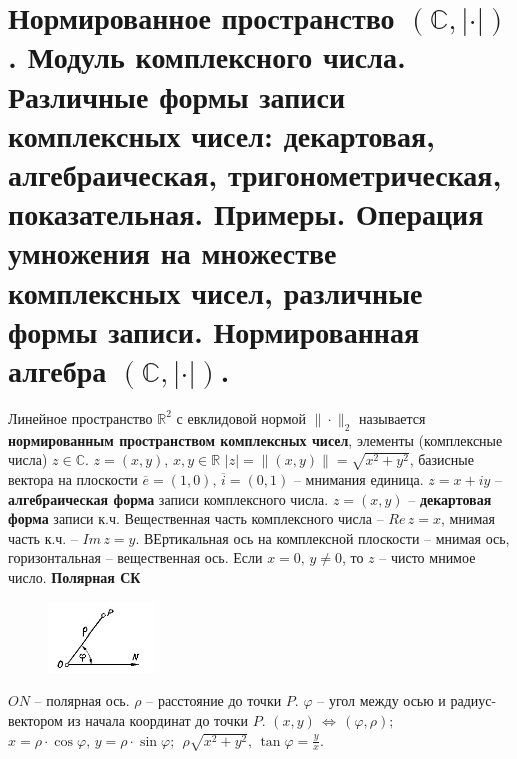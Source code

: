 \documentclass{article}
\newcommand{\R}{\mathbb R}
\newcommand{\n}{\bigbreak}
\begin{document}
\newpage
\section{Нормированное пространство $(\mathbb{C},|\cdot|)$ . Модуль комплексного числа. Различные формы записи комплексных чисел: декартовая, алгебраическая, тригонометрическая, показательная. Примеры. Операция умножения на множестве комплексных чисел, различные формы записи. Нормированная алгебра $(\mathbb{C},|\cdot|)$.}
Линейное пространство $\R^2$ с евклидовой нормой $\|\cdot\|_2$ называется \textbf{нормированным пространством комплексных чисел}, элементы (комплексные числа) $z\in\mathbb{C}$.
\newline
\newline
$z=(x,y),\,x,y\in\R$
\newline
$|z|=\|(x,y)\|=\sqrt{x^2+y^2}$, базисные вектора на плоскости $\overline{e}=(1,0),\,\overline{i}=(0,1)$ -- мнимания единица.
\newline
\newline
$z=x+iy$ -- \textbf{алгебраическая форма} записи комплексного числа.
\newline
$z=(x,y)$ -- \textbf{декартовая форма} записи к.ч.
\newline
\newline
Вещественная часть комплексного числа -- $Re\,z=x$, мнимая часть к.ч. -- $Im\,z=y$. ВЕртикальная ось на комплексной плоскости -- мнимая ось, горизонтальная -- вещественная ось. Если $x=0,\,y\neq 0$, то $z$ -- чисто мнимое число. 
\n
\textbf{Полярная СК}
\newline
\newline
\begin{figure}
    \centering
    \includegraphics[width=0.25\textwidth]{la.png}
\end{figure}
$ON$ -- полярная ось. $\rho$ -- расстояние до точки $P$. $\varphi$ -- угол между осью и радиус-вектором из начала координат до точки $P$.
\newline
\newline
$(x,y)\,\Leftrightarrow\,(\varphi,\rho);$
\newline
\newline 
$x=\rho\cdot\cos\varphi,\,y=\rho\cdot\sin\varphi;\:\:\rho\sqrt{x^2+y^2},\,\tan\varphi=\frac{y}{x}$.
\end{document}
